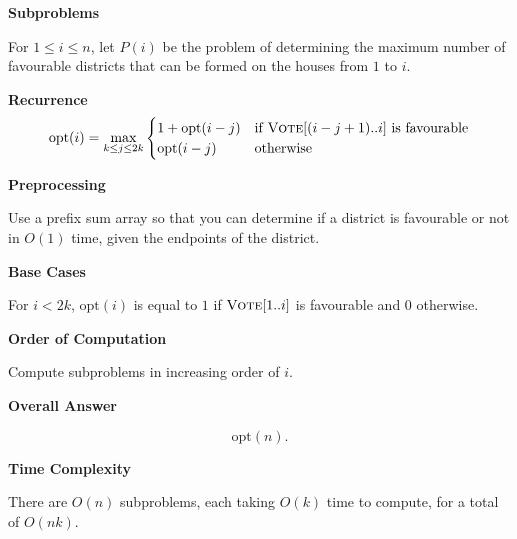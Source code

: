 \documentclass{article}
\begin{document}
\pagebreak
\begin{solution}




\textbf{Subproblems}

For $1\leq i\leq n$, let $P(i)$ be the problem of determining the maximum 
number of favourable districts that can be formed on the houses from $1$ to $i$.

\textbf{Recurrence}
$$
\mathrm{opt}(i)=\max_{k\leq j \leq 2k}\begin{cases}
    1+\mathrm{opt}(i-j) &\text{if $\textsc{Vote}[(i-j+1)..i]$ is favourable}\\
    \mathrm{opt}(i-j) &\text{otherwise}
\end{cases}
$$

\textbf{Preprocessing}

Use a prefix sum array so that you can determine if a district is favourable 
or not in $O(1)$ time, given the endpoints of the district.

\textbf{Base Cases}

For $i<2k$, $\mathrm{opt}(i)$ is equal to $1$ if $\textsc{Vote}[1..i]$ is favourable and $0$ otherwise.

\textbf{Order of Computation}

Compute subproblems in increasing order of $i$.

\textbf{Overall Answer}

$$\mathrm{opt}(n).$$

\textbf{Time Complexity}

There are $O(n)$ subproblems, each taking $O(k)$ time to compute, for a total of $O(nk)$.

\end{solution}
\end{document}
